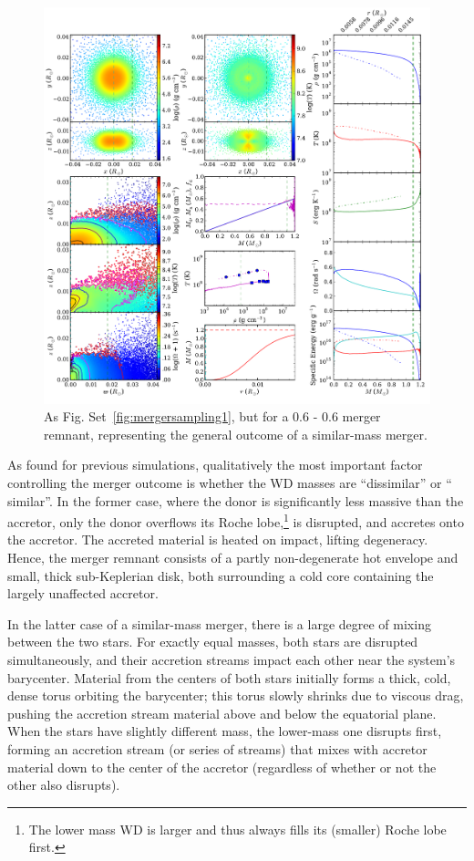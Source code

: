 \begin{figure}
\centering
\includegraphics[width=1.0\columnwidth]{chapter2_zhu+13/figures/pt6pt6.pdf}
\caption{As Fig. Set~\ref{fig:mergersampling1}, but for a 0.6 - 0.6 {\Msun} merger remnant, representing the general outcome of a similar-mass merger.}
\label{fig:mergersampling2}
\end{figure}

As found for previous simulations, qualitatively the most important factor controlling the merger outcome is whether the WD masses are ``dissimilar'' or `` similar''.  In the former case, where the donor is significantly less massive than the accretor, only the donor overflows its Roche lobe,\footnote{The lower mass WD is larger and thus always fills its (smaller) Roche lobe first.} is disrupted, and accretes onto the accretor.  The accreted material is heated on impact, lifting degeneracy.  Hence, the merger remnant consists of a partly non-degenerate hot envelope and small, thick sub-Keplerian disk, both surrounding a cold core containing the largely unaffected accretor.

In the latter case of a similar-mass merger, there is a large degree of mixing between the two stars.  For exactly equal masses, both stars are disrupted simultaneously, and their accretion streams impact each other near the system's barycenter.  Material from the centers of both stars initially forms a thick, cold, dense torus orbiting the barycenter; this torus slowly shrinks due to viscous drag, pushing the accretion stream material above and below the equatorial plane.  When the stars have slightly different mass, the lower-mass one disrupts first, forming an accretion stream (or series of streams) that mixes with accretor material down to the center of the accretor (regardless of whether or not the other also disrupts).

